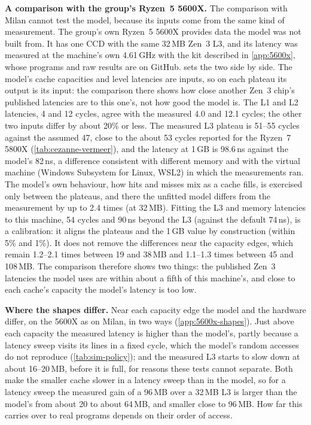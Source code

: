

\textbf{A comparison with the group's Ryzen~5 5600X.} The comparison with Milan cannot test the model, because its inputs come from the same kind of measurement. The group's own Ryzen~5 5600X provides data the model was not built from. It has one CCD with the same 32\,MB Zen~3 L3, and its latency was measured at the machine's own 4.61\,GHz with the kit described in \cref{app:5600x}, whose programs and raw results are on GitHub.  sets the two side by side. The model's cache capacities and level latencies are inputs, so on each plateau its output is its input: the comparison there shows how close another Zen~3 chip's published latencies are to this one's, not how good the model is. The L1 and L2 latencies, 4 and 12 cycles, agree with the measured 4.0 and 12.1 cycles; the other two inputs differ by about 20\% or less. The measured L3 plateau is 51--55 cycles against the assumed 47, close to the about 53 cycles reported for the Ryzen~7 5800X (\cref{tab:cezanne-vermeer}), and the latency at 1\,GB is 98.6\,ns against the model's 82\,ns, a difference consistent with different memory and with the virtual machine (Windows Subsystem for Linux, WSL2) in which the measurements ran. The model's own behaviour, how hits and misses mix as a cache fills, is exercised only between the plateaus, and there the unfitted model differs from the measurement by up to 2.4 times (at 32\,MB). Fitting the L3 and memory latencies to this machine, 54 cycles and 90\,ns beyond the L3 (against the default 74\,ns), is a calibration: it aligns the plateaus and the 1\,GB value by construction (within 5\% and 1\%). It does not remove the differences near the capacity edges, which remain 1.2--2.1 times between 19 and 38\,MB and 1.1--1.3 times between 45 and 108\,MB. The comparison therefore shows two things: the published Zen~3 latencies the model uses are within about a fifth of this machine's, and close to each cache's capacity the model's latency is too low.



\textbf{Where the shapes differ.} Near each capacity edge the model and the hardware differ, on the 5600X as on Milan, in two ways (\cref{app:5600x-shapes}). Just above each capacity the measured latency is higher than the model's, partly because a latency sweep visits its lines in a fixed cycle, which the model's random accesses do not reproduce (\cref{tab:sim-policy}); and the measured L3 starts to slow down at about 16--20\,MB, before it is full, for reasons these tests cannot separate. Both make the smaller cache slower in a latency sweep than in the model, so for a latency sweep the measured gain of a 96\,MB over a 32\,MB L3 is larger than the model's from about 20 to about 64\,MB, and smaller close to 96\,MB. How far this carries over to real programs depends on their order of access.

